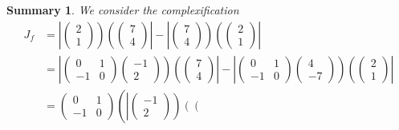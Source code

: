 \documentclass[aps,preprint]{revtex4}
\newtheorem{summary}[theorem]{Summary}
\begin{document}
\begin{summary}
We consider the complexification 
\begin{align}
J_{f}& =\left\vert \left( 
\begin{array}{c}
2 \\ 
1%
\end{array}%
\right) \right) \left( \left( 
\begin{array}{c}
7 \\ 
4%
\end{array}%
\right) \right\vert -\left\vert \left( 
\begin{array}{c}
7 \\ 
4%
\end{array}%
\right) \right) \left( \left( 
\begin{array}{c}
2 \\ 
1%
\end{array}%
\right) \right\vert \\
& =\left\vert \left( 
\begin{array}{cc}
0 & 1 \\ 
-1 & 0%
\end{array}%
\right) \left( 
\begin{array}{c}
-1 \\ 
2%
\end{array}%
\right) \right) \left( \left( 
\begin{array}{c}
7 \\ 
4%
\end{array}%
\right) \right\vert -\left\vert \left( 
\begin{array}{cc}
0 & 1 \\ 
-1 & 0%
\end{array}%
\right) \left( 
\begin{array}{c}
4 \\ 
-7%
\end{array}%
\right) \right) \left( \left( 
\begin{array}{c}
2 \\ 
1%
\end{array}%
\right) \right\vert \\
& =\left( 
\begin{array}{cc}
0 & 1 \\ 
-1 & 0%
\end{array}%
\right) \left( \left\vert \left( 
\begin{array}{c}
-1 \\ 
2%
\end{array}%
\right) \right) \left( \left( 
\begin{array}{c}

\end{array}
\end{align}
\end{summary}
\end{document}
